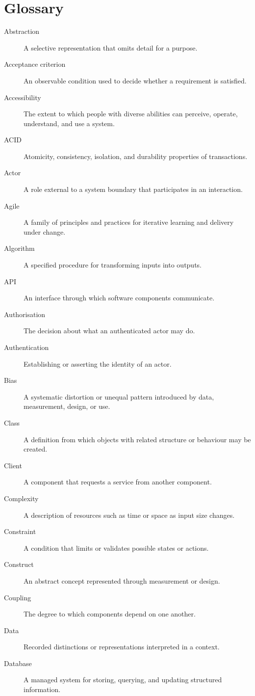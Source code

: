 \chapter{Glossary}
\label{app:glossary}

\begin{description}
\item[Abstraction] A selective representation that omits detail for a purpose.
\item[Acceptance criterion] An observable condition used to decide whether a requirement is satisfied.
\item[Accessibility] The extent to which people with diverse abilities can perceive, operate, understand, and use a system.
\item[ACID] Atomicity, consistency, isolation, and durability properties of transactions.
\item[Actor] A role external to a system boundary that participates in an interaction.
\item[Agile] A family of principles and practices for iterative learning and delivery under change.
\item[Algorithm] A specified procedure for transforming inputs into outputs.
\item[API] An interface through which software components communicate.
\item[Authorisation] The decision about what an authenticated actor may do.
\item[Authentication] Establishing or asserting the identity of an actor.
\item[Bias] A systematic distortion or unequal pattern introduced by data, measurement, design, or use.
\item[Class] A definition from which objects with related structure or behaviour may be created.
\item[Client] A component that requests a service from another component.
\item[Complexity] A description of resources such as time or space as input size changes.
\item[Constraint] A condition that limits or validates possible states or actions.
\item[Construct] An abstract concept represented through measurement or design.
\item[Coupling] The degree to which components depend on one another.
\item[Data] Recorded distinctions or representations interpreted in a context.
\item[Database] A managed system for storing, querying, and updating structured information.

\end{description}
